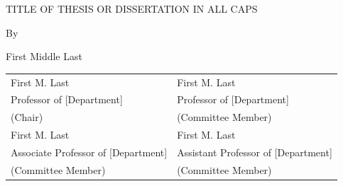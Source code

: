 \documentclass[12pt]{report} %
\title{\ManuscriptTitle}
\author{\AuthorFullName}
\date{\GradMonthYear}
\newcommand{\ManuscriptTitle}{TITLE OF THESIS OR DISSERTATION IN ALL CAPS}
\newcommand{\AuthorFullName}{First Middle Last} %
\begin{document}
\setcounter{page}{1}

\thispagestyle{empty}
\begin{center}
\ManuscriptTitle\par
\vspace{0.5in}
By\par
\AuthorFullName\par
\vspace{0.75in}
\end{center}

\begin{singlespace}
\noindent
\begin{tabular*}{\textwidth}{@{\extracolsep{\fill}}ll@{}}
First M. Last & First M. Last \\
Professor of [Department] & Professor of [Department] \\
(Chair) \vspace{1cm} & (Committee Member) \\
First M. Last & First M. Last \\
Associate Professor of [Department] & Assistant Professor of [Department] \\
(Committee Member) & (Committee Member) \\
\end{tabular*}
\end{singlespace}
\clearpage
\end{document}

